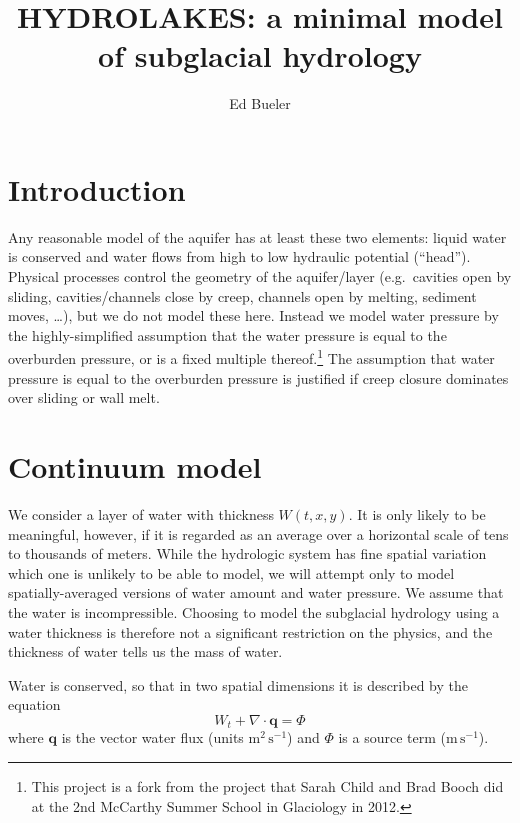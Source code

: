\documentclass[12pt,final]{amsart}%
\title[]{HYDROLAKES:  a minimal model of subglacial hydrology}
\author[]{Ed Bueler}
\newcommand\bq{\mathbf{q}}
\newcommand{\Div}{\nabla\cdot}
\begin{document}
\maketitle

\thispagestyle{empty}


\section{Introduction}

Any reasonable model of the aquifer has at least these two elements: liquid water is conserved and water flows from high to low hydraulic potential (``head'').  Physical processes control the geometry of the aquifer/layer (e.g.~cavities open by sliding, cavities/channels close by creep, channels open by melting, sediment moves, \dots), but we do not model these here.  Instead we model water pressure by the highly-simplified assumption that the water pressure is equal to the overburden pressure, or is a fixed multiple thereof.\footnote{This project is a fork from the project that Sarah Child and Brad Booch did at the 2nd McCarthy Summer School in Glaciology in 2012.}  The assumption that water pressure is equal to the overburden pressure is justified if creep closure dominates over sliding or wall melt.





\section{Continuum model}

We consider a layer of water with thickness $W(t,x,y)$.  It is only likely to be meaningful, however, if it is regarded as an average over a horizontal scale of tens to thousands of meters.  While the hydrologic system has fine spatial variation which one is unlikely to be able to model, we will attempt only to model spatially-averaged versions of water amount and water pressure.  We assume that the water is incompressible.  Choosing to model the subglacial hydrology using a water thickness is therefore not a significant restriction on the physics, and the thickness of water tells us the mass of water.

Water is conserved, so that in two spatial dimensions it is described by the equation \citep{Clarke05}
\begin{equation} \label{eq:conserve}
W_t + \Div \bq = \Phi
\end{equation}
where $\bq$ is the vector water flux (units $\text{m}^2\,\text{s}^{-1}$) and $\Phi$ is a source term ($\text{m}\,\text{s}^{-1}$).
\end{document}

